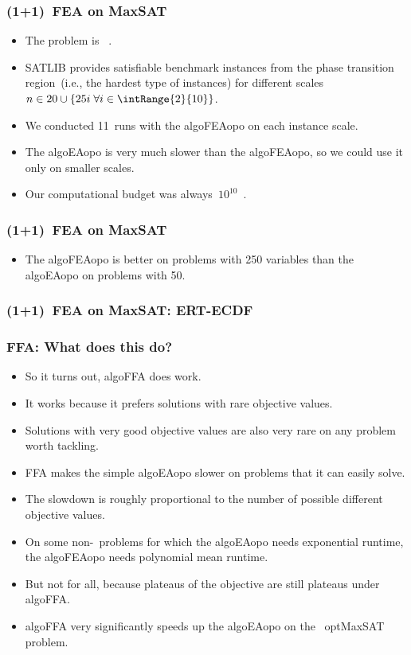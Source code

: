 \documentclass[aspectratio=169,mathserif,notheorems]{beamer}%
\begin{document}
%
\begin{frame}%
\frametitle{(1+1)~FEA on MaxSAT}%
\begin{itemize}%
\item The \cite{HS2004SLSFAA,C1971TCOTPP} problem is \npComplete~\cite{C1971TCOTPP}.%
\item<2-> \gls{SATLIB}\cite{HS2000SAORFROS} provides satisfiable benchmark instances from the phase transition region~(i.e., the hardest type of instances) for different scales~$n\in20 \cup \{25 i\; \forall i \in \intRange{2}{10}\}$.%
\item<3-> We conducted 11~runs with the \gls{algoFEAopo} on each instance scale.%
\item<4-> The \gls{algoEAopo} is very much slower than the \gls{algoFEAopo}, so we could use it only on smaller scales.%
\item<5-> Our computational budget was always~$10^{10}$~.%
\end{itemize}%
%
\end{frame}%
%
\begin{frame}%
\frametitle{(1+1)~FEA on MaxSAT}%
\parbox{0.25\paperwidth}{%
\begin{itemize}%
\item The \gls{algoFEAopo} is better on problems with 250 variables than the \gls{algoEAopo} on problems with 50.%
\end{itemize}%
}%
%
%
%
\end{frame}%
%
\begin{frame}%
\frametitle{(1+1)~FEA on MaxSAT: ERT-ECDF}%
%
%
%
\end{frame}%
%
\begin{frame}%
\frametitle{FFA: What does this do?}%
%
\begin{itemize}%
\item So it turns out, \gls{algoFFA} does work.%
\item<2-> It works because it prefers solutions with rare objective values.%
\item<3-> Solutions with very good objective values are also very rare on any problem worth tackling.%
\item<4-> FFA makes the simple \gls{algoEAopo} slower on problems that it can easily solve.%
\item<5-> The slowdown is roughly proportional to the number of possible different objective values.%
\item<6-> On some non-\npHard\ problems for which the \gls{algoEAopo} needs \alert{exponential} runtime, the \gls{algoFEAopo} needs \alert{polynomial} mean runtime.%
\item<7-> But not for all, because plateaus of the objective are still plateaus under \gls{algoFFA}.%
\item<8-> \gls{algoFFA} very significantly speeds up the \gls{algoEAopo} on the \npComplete\ \gls{optMaxSAT} problem.%
\end{itemize}%
%
\end{frame}%
\end{document}
